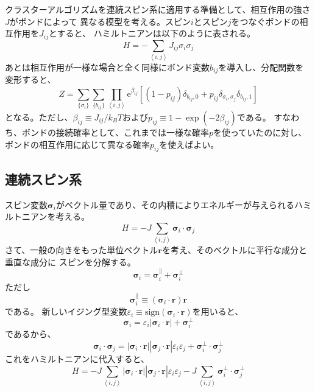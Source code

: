 \documentclass{jarticle}
\begin{document}
クラスターアルゴリズムを連続スピン系に適用する準備として、相互作用の強さ$J$がボンドによって
異なる模型を考える。スピン$i$とスピン$j$をつなぐボンドの相互作用を$J_{ij}$とすると、
ハミルトニアンは以下のように表される。
\begin{equation}
  H = - \sum_{\left<i, j\right>} J_{ij} \sigma_i \sigma_j
\end{equation}
あとは相互作用が一様な場合と全く同様にボンド変数$b_{ij}$を導入し、分配関数を変形すると、
\begin{equation}
  Z =  \sum_{\{\sigma_i\}} \sum_{\{b_{ij}\}}  \prod_{\left<i, j\right>}   \mathrm{e}^{\beta_{ij}} \left[(1-p_{ij}) \delta_{b_{ij},0} +  p_{ij} \delta_{\sigma_i, \sigma_j} \delta_{b_{ij},1} \right]
\end{equation}
となる。ただし、$\beta_{ij} \equiv J_{ij}/k_B T$および$p_{ij} \equiv 1 - \exp(-2 \beta_{ij})$である。
すなわち、ボンドの接続確率として、これまでは一様な確率$p$を使っていたのに対し、
ボンドの相互作用に応じて異なる確率$p_{ij}$を使えばよい。

\subsection{連続スピン系}

スピン変数$\mathbf{\sigma}_i$がベクトル量であり、その内積によりエネルギーが与えられるハミルトニアンを考える。
\begin{equation}
  H = -J \sum_{\left<i, j\right>}  \mathbf{\sigma}_i \cdot \mathbf{\sigma}_j
\end{equation}
さて、一般の向きをもった単位ベクトル$\mathbf{r}$を考え、そのベクトルに平行な成分と垂直な成分に
スピンを分解する。
\begin{equation}
  \mathbf{\sigma}_i = \mathbf{\sigma}_i^\parallel + \mathbf{\sigma}_i^\perp
\end{equation}
ただし
\begin{equation}
  \mathbf{\sigma}_i^\parallel \equiv (\mathbf{\sigma}_i \cdot \mathbf{r}) \mathbf{r}
\end{equation}
である。
新しいイジング型変数$\varepsilon_i \equiv \mathrm{sign}(\mathbf{\sigma}_i \cdot \mathbf{r})$を用いると、
\begin{equation}
  \mathbf{\sigma}_i =  \varepsilon_i |\mathbf{\sigma}_i \cdot \mathbf{r}| +  \mathbf{\sigma}_i^\perp
\end{equation}
であるから、
\begin{equation}
  \mathbf{\sigma}_i \cdot \mathbf{\sigma}_j  =  |\mathbf{\sigma}_i \cdot \mathbf{r}|  |\mathbf{\sigma}_j \cdot \mathbf{r}|  \varepsilon_i  \varepsilon_j + \mathbf{\sigma}_i^\perp \cdot \mathbf{\sigma}_j^\perp
\end{equation}
これをハミルトニアンに代入すると、
\begin{equation}
  H = -J \sum_{\left<i, j\right>}   |\mathbf{\sigma}_i \cdot \mathbf{r}|  |\mathbf{\sigma}_j \cdot \mathbf{r}|  \varepsilon_i  \varepsilon_j  -J \sum_{\left<i, j\right>} \mathbf{\sigma}_i^\perp \cdot \mathbf{\sigma}_j^\perp \label{eq_wolff}
\end{equation}
\end{document}
